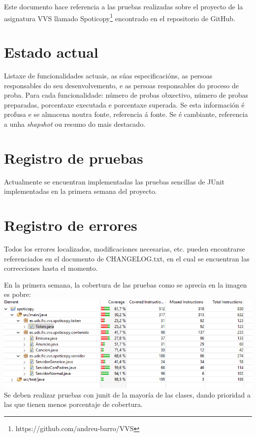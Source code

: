 \documentclass[12pt, a4paper, titlepage]{article}
\begin{document}
Este documento hace referencia a las pruebas realizadas sobre el proyecto de la asignatura VVS llamado Spoticopy\footnote{https://github.com/andreu-barro/VVS} encontrado en el repositorio de GitHub.

\section{Estado actual}

Listaxe de funcionalidades actuais, as súas especificacións, as persoas responsables do seu desenvolvemento, e as persoas responsables do proceso de proba.  Para cada funcionalidade: número de probas obxectivo, número de probas preparadas, porcentaxe executada e porcentaxe superada. Se esta información é profusa e se almacena noutra fonte, referencia á fonte. Se é cambiante, referencia a unha \emph{shapshot} ou resumo do mais destacado.

\section{Registro de pruebas}

Actualmente se encuentran implementadas las pruebas sencillas de JUnit implementadas en la primera semana del proyecto.

\section{Registro de errores}

Todos los errores localizados, modificaciones necesarias, etc. pueden encontrarse referenciados en el documento de CHANGELOG.txt, en el cual se encuentran las correcciones hasta el momento.

En la primera semana, la cobertura de las pruebas como se aprecia en la imagen es pobre:\\
\includegraphics[width=15cm]{Imagenes/CoberturaSemana1.png} \\
Se deben realizar pruebas con junit de la mayoría de las clases, dando prioridad a las que tienen menos porcentaje de cobertura.
\end{document}
